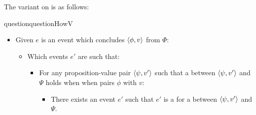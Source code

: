 \begin{note}
  The variant on \qHow{} is as follows:

  \begin{restatable}[\qHowV{}]{question}{questionHowV}
    \label{q:how:v}

    \begin{itemize}
    \item
      Given \(e\) is an event which \vAgent{} concludes \(\langle \phi, v \rangle\) from \(\Phi\):
      \begin{itemize}
      \item
        Which events \(e'\) are such that:
        \begin{itemize}
        \item
          For any proposition-value pair \(\langle \psi, v' \rangle\) such that a \ros{} between \(\langle \psi, v' \rangle\) and \(\Psi\) holds when when \vAgent{} pairs \(\phi\) with \(v\):
          \begin{itemize}
          \item
            There exists an event \(e'\) such that \(e'\) is a  for a \ros{} between \(\langle \psi, v' \rangle\) and \(\Psi\).
          \end{itemize}
        \end{itemize}
      \end{itemize}
    \end{itemize}

    \vspace{-\baselineskip}
  \end{restatable}


\end{note}
